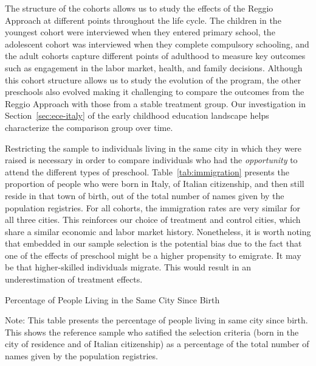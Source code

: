 The structure of the cohorts allows us to study the effects of the Reggio Approach at different points throughout the life cycle. The children in the youngest cohort were interviewed when they entered primary school, the adolescent cohort was interviewed when they complete compulsory schooling, and the adult cohorts capture different points of adulthood to measure key outcomes such as engagement in the labor market, health, and family decisions. Although this cohort structure allows us to study the evolution of the program, the other preschools also evolved making it challenging to compare the outcomes from the Reggio Approach with those from a stable treatment group. Our investigation in Section~\ref{sec:ece-italy} of the early childhood education landscape helps characterize the comparison group over time.

Restricting the sample to individuals living in the same city in which they were raised is necessary in order to compare individuals who had the \textit{opportunity} to attend the different types of preschool. Table~\ref{tab:immigration} presents the proportion of people who were born in Italy, of Italian citizenship, and then still reside in that town of birth, out of the total number of names given by the population registries. For all cohorts, the immigration rates are very similar for all three cities. This reinforces our choice of treatment and control cities, which share a similar economic and labor market history. Nonetheless, it is worth noting that embedded in our sample selection is the potential bias due to the fact that one of the effects of preschool might be a higher propensity to emigrate. It may be that higher-skilled individuals migrate. This would result in an underestimation of treatment effects.

\begin{table}[H]
\centering
\begin{threeparttable}
	\caption{Percentage of People Living in the Same City Since Birth}\label{tab:immigration}
	
\begin{tablenotes}
\footnotesize
Note: This table presents the percentage of people living in same city since birth. This  shows the reference sample who satified the selection criteria (born in the city of residence and of Italian citizenship) as a percentage of the total number of names given by the population registries.
\end{tablenotes}
\end{threeparttable}
\end{table}

